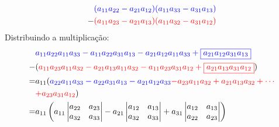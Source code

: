 \documentclass{beamer}
\begin{document}
\begin{frame}
  \begin{align*}
    &\textcolor{blue}{(a_{11}a_{22}-a_{21}a_{12})}\textcolor{blue}{(a_{11}a_{33}-a_{31}a_{13})} \\
  - &\textcolor{red}{(a_{11}a_{23}-a_{21}a_{13})}\textcolor{red}{(a_{11}a_{32} -a_{31}a_{12})}
  \end{align*}
  Distribuindo a multiplicação:
  \begin{align*}
    &\textcolor{blue}{a_{11}a_{22}a_{11}a_{33}- a_{11}a_{22}a_{31}a_{13} -a_{21}a_{12}a_{11}a_{33}+ \fbox{$a_{21}a_{12}a_{31}a_{13}$}} \\
  - &(\textcolor{red}{a_{11}a_{23}a_{11}a_{32} -a_{21}a_{13} a_{11}a_{32} -a_{11}a_{23}a_{31}a_{12} +\fbox{$a_{21}a_{13}a_{31}a_{12}$}}) \\
  = & a_{11}(\textcolor{blue}{ a_{22}a_{11}a_{33} - 
  a_{22}a_{31}a_{13} -a_{21}a_{12}a_{33}}\textcolor{red}{-
  a_{23}a_{11}a_{32}+a_{21}a_{13}a_{32}+ \cdots }\\
  & \textcolor{red}{+ a_{23}a_{31}a_{12}}) \\
  = &
  a_{11}\left( a_{11}
   \begin{vmatrix}
    a_{22} & a_{23} \\
    a_{32} & a_{33}
  \end{vmatrix} -
   a_{21}
   \begin{vmatrix}
    a_{12} & a_{13} \\
    a_{32} & a_{33}
  \end{vmatrix} + a_{31}
  \begin{vmatrix}
    a_{12} & a_{13}\\
    a_{22} & a_{23}
  \end{vmatrix} \right) 
  \end{align*}
\end{frame}
\end{document}
